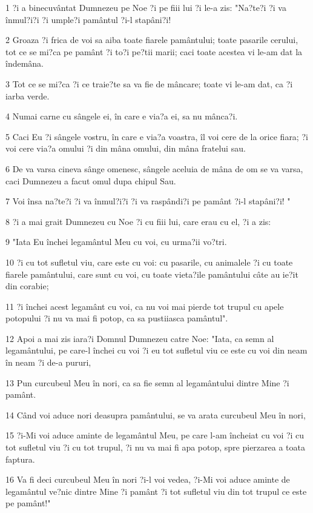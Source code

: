 \par 1 ?i a binecuvântat Dumnezeu pe Noe ?i pe fiii lui ?i le-a zis: "Na?te?i ?i va înmul?i?i ?i umple?i pamântul ?i-l stapâni?i!
\par 2 Groaza ?i frica de voi sa aiba toate fiarele pamântului; toate pasarile cerului, tot ce se mi?ca pe pamânt ?i to?i pe?tii marii; caci toate acestea vi le-am dat la îndemâna.
\par 3 Tot ce se mi?ca ?i ce traie?te sa va fie de mâncare; toate vi le-am dat, ca ?i iarba verde.
\par 4 Numai carne cu sângele ei, în care e via?a ei, sa nu mânca?i.
\par 5 Caci Eu ?i sângele vostru, în care e via?a voastra, îl voi cere de la orice fiara; ?i voi cere via?a omului ?i din mâna omului, din mâna fratelui sau.
\par 6 De va varsa cineva sânge omenesc, sângele aceluia de mâna de om se va varsa, caci Dumnezeu a facut omul dupa chipul Sau.
\par 7 Voi însa na?te?i ?i va înmul?i?i ?i va raspândi?i pe pamânt ?i-l stapâni?i! "
\par 8 ?i a mai grait Dumnezeu cu Noe ?i cu fiii lui, care erau cu el, ?i a zis:
\par 9 "Iata Eu închei legamântul Meu cu voi, cu urma?ii vo?tri.
\par 10 ?i cu tot sufletul viu, care este cu voi: cu pasarile, cu animalele ?i cu toate fiarele pamântului, care sunt cu voi, cu toate vieta?ile pamântului câte au ie?it din corabie;
\par 11 ?i închei acest legamânt cu voi, ca nu voi mai pierde tot trupul cu apele potopului ?i nu va mai fi potop, ca sa pustiiasca pamântul".
\par 12 Apoi a mai zis iara?i Domnul Dumnezeu catre Noe: "Iata, ca semn al legamântului, pe care-l închei cu voi ?i eu tot sufletul viu ce este cu voi din neam în neam ?i de-a pururi,
\par 13 Pun curcubeul Meu în nori, ca sa fie semn al legamântului dintre Mine ?i pamânt.
\par 14 Când voi aduce nori deasupra pamântului, se va arata curcubeul Meu în nori,
\par 15 ?i-Mi voi aduce aminte de legamântul Meu, pe care l-am încheiat cu voi ?i cu tot sufletul viu ?i cu tot trupul, ?i nu va mai fi apa potop, spre pierzarea a toata faptura.
\par 16 Va fi deci curcubeul Meu în nori ?i-l voi vedea, ?i-Mi voi aduce aminte de legamântul ve?nic dintre Mine ?i pamânt ?i tot sufletul viu din tot trupul ce este pe pamânt!"
